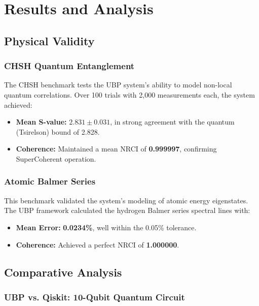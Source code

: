 \documentclass[10pt, a4paper]{article}
\begin{document}
\section{Results and Analysis}

\subsection{Physical Validity}

\subsubsection{CHSH Quantum Entanglement}

The CHSH benchmark tests the UBP system’s ability to model non-local quantum correlations. Over 100 trials with 2,000 measurements each, the system achieved:

\begin{itemize}
    \item \textbf{Mean S-value:} \(2.831 \pm 0.031\), in strong agreement with the quantum (Tsirelson) bound of 2.828.
    \item \textbf{Coherence:} Maintained a mean NRCI of \textbf{0.999997}, confirming SuperCoherent operation.
\end{itemize}

\subsubsection{Atomic Balmer Series}

This benchmark validated the system’s modeling of atomic energy eigenstates. The UBP framework calculated the hydrogen Balmer series spectral lines with:

\begin{itemize}
    \item \textbf{Mean Error:} \textbf{0.0234\%}, well within the 0.05\% tolerance.
    \item \textbf{Coherence:} Achieved a perfect NRCI of \textbf{1.000000}.
\end{itemize}

\subsection{Comparative Analysis}

\subsubsection{UBP vs. Qiskit: 10-Qubit Quantum Circuit}
\end{document}
